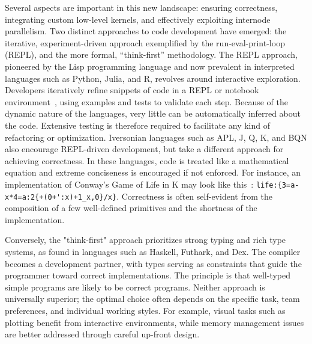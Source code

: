Several aspects are important in this new landscape: ensuring correctness, integrating custom low-level kernels, and effectively exploiting internode parallelism. Two distinct approaches to code development have emerged: the iterative, experiment-driven approach exemplified by the run-eval-print-loop (REPL), and the more formal, ``think-first'' methodology. The REPL approach, pioneered by the Lisp programming language and now prevalent in interpreted languages such as Python, Julia, and R, revolves around interactive exploration. Developers iteratively refine snippets of code in a REPL or notebook environment~, using examples and tests to validate each step. Because of the dynamic nature of the languages, very little can be automatically inferred about the code. Extensive testing is therefore required to facilitate any kind of refactoring or optimization. Iversonian languages such as APL, J, Q, K, and BQN also encourage REPL-driven development, but take a different approach for achieving correctness. In these languages, code is treated like a mathematical equation and extreme conciseness is encouraged if not enforced. For instance, an implementation of Conway's Game of Life in K may look like this~: \verb|life:{3=a-x*4=a:2{+(0+':x)+1_x,0}/x}|. Correctness is often self-evident from the composition of a few well-defined primitives and the shortness of the implementation.

Conversely, the "think-first" approach prioritizes strong typing and rich type systems, as found in languages such as Haskell, Futhark, and Dex. The compiler becomes a development partner, with types serving as constraints that guide the programmer toward correct implementations. The principle is that well-typed simple programs are likely to be correct programs. Neither approach is universally superior; the optimal choice often depends on the specific task, team preferences, and individual working styles. For example, visual tasks such as plotting benefit from interactive environments, while memory management issues are better addressed through careful up-front design.

